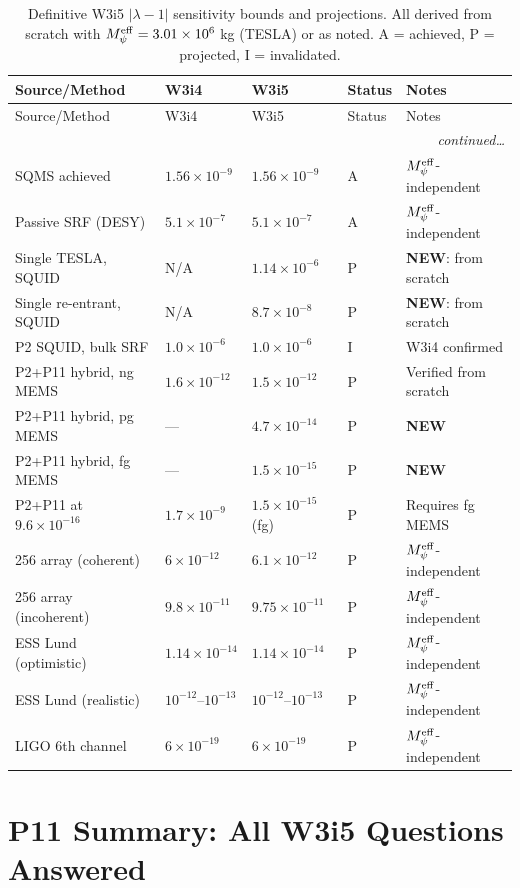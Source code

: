 \documentclass[11pt]{article}
\theoremstyle{definition}
\theoremstyle{remark}
\newcommand{\lam}{\lambda}
\newcommand{\Meff}{M_\psi^{\rm eff}}
\newcommand{\ee}[1]{\times 10^{#1}}
\begin{document}
\begin{longtable}{@{}p{4.5cm}lllp{3cm}@{}}
\caption{Definitive W3i5 $|\lam-1|$ sensitivity bounds and projections.
All derived from scratch with $\Meff = 3.01\ee{6}$ kg (TESLA) or
as noted. A = achieved, P = projected, I = invalidated.}
\label{tab:w3i5_landscape}\\
\toprule
Source/Method & W3i4 & W3i5 & Status & Notes \\
\midrule
\endfirsthead
\toprule
Source/Method & W3i4 & W3i5 & Status & Notes \\
\midrule
\endhead
\midrule\multicolumn{5}{r}{\textit{continued\ldots}}\\\endfoot
\bottomrule\endlastfoot
%
SQMS achieved & $1.56\ee{-9}$ & $1.56\ee{-9}$ & A
  & $\Meff$-independent \\
Passive SRF (DESY) & $5.1\ee{-7}$ & $5.1\ee{-7}$ & A
  & $\Meff$-independent \\
Single TESLA, SQUID & N/A & $1.14\ee{-6}$ & P
  & \textbf{NEW}: from scratch \\
Single re-entrant, SQUID & N/A & $8.7\ee{-8}$ & P
  & \textbf{NEW}: from scratch \\
P2 SQUID, bulk SRF & $1.0\ee{-6}$ & $1.0\ee{-6}$ & I
  & W3i4 confirmed \\
P2+P11 hybrid, ng MEMS & $1.6\ee{-12}$ & $1.5\ee{-12}$ & P
  & Verified from scratch \\
P2+P11 hybrid, pg MEMS & --- & $4.7\ee{-14}$ & P
  & \textbf{NEW} \\
P2+P11 hybrid, fg MEMS & --- & $1.5\ee{-15}$ & P
  & \textbf{NEW} \\
P2+P11 at $9.6\ee{-16}$ & $1.7\ee{-9}$ & $1.5\ee{-15}$ (fg)
  & P & Requires fg MEMS \\
256 array (coherent) & $6\ee{-12}$ & $6.1\ee{-12}$ & P
  & $\Meff$-independent \\
256 array (incoherent) & $9.8\ee{-11}$ & $9.75\ee{-11}$ & P
  & $\Meff$-independent \\
ESS Lund (optimistic) & $1.14\ee{-14}$ & $1.14\ee{-14}$ & P
  & $\Meff$-independent \\
ESS Lund (realistic) & $10^{-12}$--$10^{-13}$ & $10^{-12}$--$10^{-13}$
  & P & $\Meff$-independent \\
LIGO 6th channel & $6\ee{-19}$ & $6\ee{-19}$ & P
  & $\Meff$-independent \\
\end{longtable}

\section{P11 Summary: All W3i5 Questions Answered}
\label{sec:p11_summary}
\end{document}
